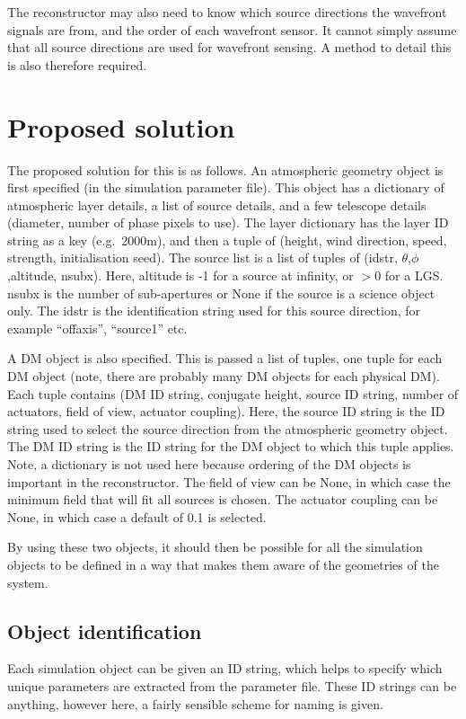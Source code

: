 \documentclass{article}
\begin{document}
The reconstructor may also need to know which source directions the
wavefront signals are from, and the order of each wavefront sensor.
It cannot simply assume that all source directions are used for
wavefront sensing.  A method to detail this is also therefore
required.  

\section{Proposed solution}
The proposed solution for this is as follows.  An atmospheric geometry
object is first specified (in the simulation parameter file).  This
object has a dictionary of atmospheric layer details, a list of
source details, and a few telescope details (diameter, number of phase
pixels to use).  The layer dictionary has the layer ID string as a key
(e.g.\ 2000m), and then a tuple of (height, wind direction, speed,
strength, initialisation seed).  The source list is a list of tuples of
(idstr, $\theta$,$\phi$,altitude, nsubx).  Here, altitude is -1 for a source at
infinity, or $>$0 for a LGS.  nsubx is the number of sub-apertures or
None if the source is a science object only.  The idstr is the
identification string used for this source direction, for example
``offaxis'', ``source1'' etc.

A DM object is also specified.  This is passed a list of tuples, one
tuple for each DM object (note, there are probably many DM objects for
each physical DM).  Each tuple contains (DM ID string, conjugate
height, source ID string, number of actuators, field of view, actuator
coupling).  Here, the source ID string is the ID string used to select
the source direction from the atmospheric geometry object.  The DM ID
string is the ID string for the DM object to which this tuple applies.
Note, a dictionary is not used here because ordering of the DM objects
is important in the reconstructor.  The field of view can be None, in
which case the minimum field that will fit all sources is chosen.  The
actuator coupling can be None, in which case a default of 0.1 is
selected.

By using these two objects, it should then be possible for all the
simulation objects to be defined in a way that makes them aware of the
geometries of the system.

\subsection{Object identification}
Each simulation object can be given an ID string, which helps to
specify which unique parameters are extracted from the parameter file.
These ID strings can be anything, however here, a fairly sensible
scheme for naming is given.
\end{document}
